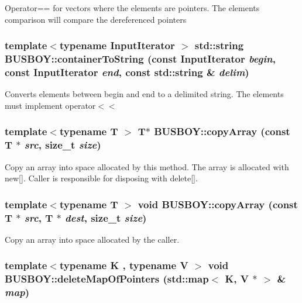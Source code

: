 Operator== for vectors where the elements are pointers. The elements comparison will compare the dereferenced pointers \hypertarget{namespaceBUSBOY_a93313a8b24721856c352d58ce902de0b}{
\subsubsection[{containerToString}]{\setlength{\rightskip}{0pt plus 5cm}template$<$typename InputIterator $>$ std::string BUSBOY::containerToString (const InputIterator {\em begin}, \/  const InputIterator {\em end}, \/  const std::string \& {\em delim})}}
\label{namespaceBUSBOY_a93313a8b24721856c352d58ce902de0b}


Converts elements between begin and end to a delimited string. The elements must implement operator$<$$<$ \hypertarget{namespaceBUSBOY_a572172ab912dc882a1027ae02ecdec14}{
\subsubsection[{copyArray}]{\setlength{\rightskip}{0pt plus 5cm}template$<$typename T $>$ T$\ast$ BUSBOY::copyArray (const T $\ast$ {\em src}, \/  size\_\-t {\em size})}}
\label{namespaceBUSBOY_a572172ab912dc882a1027ae02ecdec14}


Copy an array into space allocated by this method. The array is allocated with new\mbox{[}\mbox{]}. Caller is responsible for disposing with delete\mbox{[}\mbox{]}. \hypertarget{namespaceBUSBOY_af886065748417a14b9702e52d3db9773}{
\subsubsection[{copyArray}]{\setlength{\rightskip}{0pt plus 5cm}template$<$typename T $>$ void BUSBOY::copyArray (const T $\ast$ {\em src}, \/  T $\ast$ {\em dest}, \/  size\_\-t {\em size})}}
\label{namespaceBUSBOY_af886065748417a14b9702e52d3db9773}


Copy an array into space allocated by the caller. \hypertarget{namespaceBUSBOY_a1a243fc2a20b020d9280a4df0e325402}{
\subsubsection[{deleteMapOfPointers}]{\setlength{\rightskip}{0pt plus 5cm}template$<$typename K , typename V $>$ void BUSBOY::deleteMapOfPointers (std::map$<$ K, V $\ast$ $>$ \& {\em map})}}
\label{namespaceBUSBOY_a1a243fc2a20b020d9280a4df0e325402}



